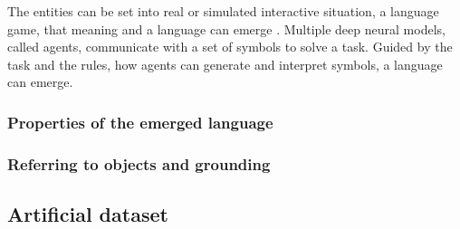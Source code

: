 The entities can be set into real or simulated interactive situation, a language game, that meaning and a language can emerge \citep{Kirby2002}.
Multiple deep neural models, called agents, communicate with a set of symbols to solve a task.
Guided by the task and the rules, how agents can generate and interpret symbols, a language can emerge.


\subsubsection{Properties of the emerged language}
\label{sec:properties-el}


\subsubsection{Referring to objects and grounding}
\label{sec:referring}

\subsection{Artificial dataset}
